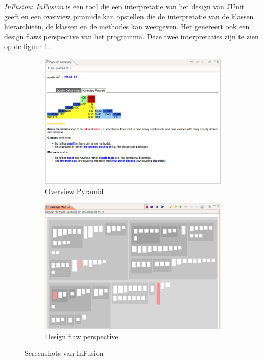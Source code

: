 \documentclass[i1]{oss}
\begin{document}
\begin{description}
\item \emph{InFusion}: \emph{InFusion} is een tool die een interpretatie van het design van JUnit geeft en een overview piramide kan opstellen die de interpretatie van de klassen hierarchie\"en, de klassen en de methodes kan weergeven. Het genereert ook een design flaws perspective van het programma. Deze twee interpretaties zijn te zien op de figuur \ref{fig:InFusion}.



\begin{figure}[h!]
\centering
	\begin{subfigure}[h]{0.65\textwidth}
		\centering
		\includegraphics[width=\textwidth]{InFusion1}
		\caption{Overview Pyramid}
	\end{subfigure}
	\begin{subfigure}[h]{0.65\textwidth}
		\centering
		\includegraphics[width=\textwidth]{InFusion2}
		\caption{Design flaw perspective}
	\end{subfigure}
\caption{Screenshots van InFusion}
\label{fig:InFusion}
\end{figure}


\end{description}
\end{document}
